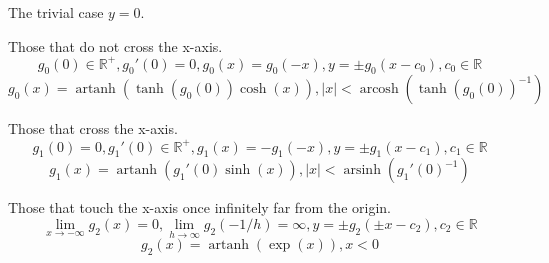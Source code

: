 \documentclass[]{article}
\DeclareMathOperator{\arsinh}{arsinh}
\DeclareMathOperator{\arcosh}{arcosh}
\DeclareMathOperator{\artanh}{artanh}
\newcommand{\abs}[1]{{\left\lvert#1\right\rvert}}
\numberwithin{equation}{section}
\begin{document}
	The trivial case $y=0$.
	
	Those that do not cross the x-axis.
	$$g_0(0)\in\mathbb{R}^+,g_0'(0)=0,g_0(x)=g_0(-x),y=\pm g_0(x-c_0),c_0\in\mathbb{R}$$
	$$g_0(x)=\artanh(\tanh(g_0(0))\cosh(x)),\abs{x}<\arcosh(\tanh(g_0(0))^{-1})$$
	
	Those that cross the x-axis. 
	$$g_1(0)=0,g_1'(0)\in\mathbb{R}^+,g_1(x)=-g_1(-x),y=\pm g_1(x-c_1),c_1\in\mathbb{R}$$
	$$g_1(x)=\artanh(g_1'(0)\sinh(x)),\abs{x}<\arsinh(g_1'(0)^{-1})$$
	
	Those that touch the x-axis once infinitely far from the origin.
	$$\lim_{x\to -\infty}g_2(x)=0,\lim_{h\to\infty}g_2(-1/h)=\infty,y=\pm g_2(\pm x-c_2),c_2\in\mathbb{R}$$
	$$g_2(x)=\artanh(\exp(x)),x<0$$
\end{document}
